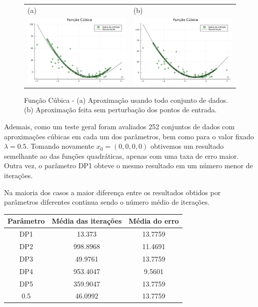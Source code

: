 \documentclass[12pt,a4paper]{article}
\begin{document}
	\begin{figure}[H]
		\centering 
		\begin{tabular}{ll}
			
			(a)& (b)   \\
			
			\includegraphics[width=0.45\linewidth]{3.png} & \includegraphics[width=0.45\linewidth]{4.png}\\ 
			
		\end{tabular}
		\caption{Função Cúbica - (a) Aproximação usando todo conjunto de dados. (b) Aproximação feita sem perturbação dos pontos de entrada.}
		\label{fig2}
	\end{figure}
	
	
	Ademais, como um teste geral foram avaliados 252 conjuntos de dados com aproximações cúbicas em cada um dos parâmetros, bem como para o valor fixado $\lambda = 0.5.$ Tomando novamente $x_0 = (0, 0, 0, 0)$ obtivemos um resultado semelhante ao das funções quadráticas, apenas com uma taxa de erro maior. Outra vez, o parâmetro DP1 obteve o mesmo resultado em um número menor de iterações.
	
	Na maioria dos casos a maior diferença entre os resultados obtidos por parâmetros diferentes continua sendo o número médio de iterações.
	
	\begin{table}[H]
		\centering
		\begin{tabular}{|c|c|c|}
			\hline
			Parâmetro & Média das iterações & Média do erro\\
			\hline
			
			DP1 & 13.373 & 13.7759\\
			\hline
			DP2 & 998.8968 & 11.4691\\ \hline
			DP3 & 49.9761 & 13.7759\\ \hline
			DP4 & 953.4047 & 9.5601\\ \hline
			DP5 & 359.9047 & 13.7759\\ \hline
			0.5 & 46.0992 & 13.7759\\		\hline	
			
		\end{tabular}
	\end{table}
\end{document}
